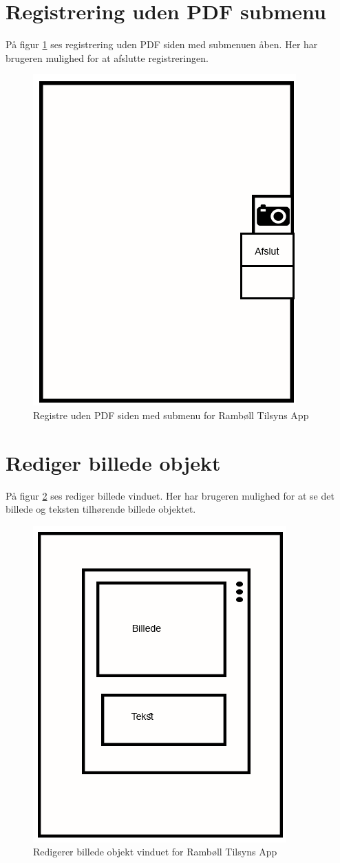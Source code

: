 \section{Registrering uden PDF submenu}\label{sec:RegUdenPDFSubMock}
På figur \ref{fig:RegUdenPDFSubMock} ses registrering uden PDF siden med submenuen åben. Her har brugeren mulighed for at afslutte registreringen.

\begin{figure}[H]
	\centering
	\includegraphics[width=0.4\linewidth]{MockUps/Mock/Ramboell-TilsynUden-sub}
	\caption{Registre uden PDF siden med submenu for Rambøll Tilsyns App}
	\label{fig:RegUdenPDFSubMock}
\end{figure}

\clearpage

\section{Rediger billede objekt}\label{sec:RedigerBilledeMock}
På figur \ref{fig:RedigerBilledeMock} ses rediger billede vinduet. Her har brugeren mulighed for at se det billede og teksten tilhørende billede objektet.

\begin{figure}[H]
	\centering
	\includegraphics[width=0.4\linewidth]{MockUps/Mock/Ramboell-RedigerBilledeOpbjekt}
	\caption{Redigerer billede objekt vinduet for Rambøll Tilsyns App}
	\label{fig:RedigerBilledeMock}
\end{figure}

